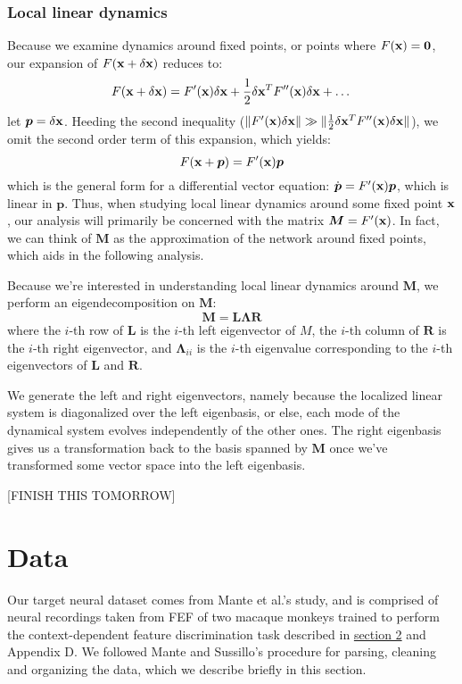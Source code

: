 \documentclass[12pt,a4paper,final]{iopart}
\begin{document}
\subsubsection{Local linear dynamics}
Because we examine dynamics around fixed points, or points where $F({\bf x}) = {\bf 0}$, our expansion of $F({\bf x} + \delta {\bf x})$ reduces to:
\[
    F({\bf x} + \delta {\bf x}) = F'({\bf x})\delta {\bf x} + \frac{1}{2} \delta {\bf x}^T F''({\bf x}) \delta {\bf x} + \dots
\]
let $\boldsymbol{p} = \delta {\bf x}$. Heeding the second inequality ($\lVert F'({\bf x})\delta {\bf x} \rVert \gg \lVert \frac{1}{2} \delta {\bf x}^T F''({\bf x}) \delta {\bf x} \rVert$), we omit the second order term of this expansion, which yields:
\[
    F({\bf x} + \boldsymbol{p}) = F'({\bf x})\boldsymbol{p} 
\]
which is the general form for a differential vector equation: $\dot{\boldsymbol{p}} = F'({\bf x})\boldsymbol{p}$, which is linear in $\boldsymbol{p}$. Thus, when studying local linear dynamics around some fixed point ${\bf x}$, our analysis will primarily be concerned with the matrix $\boldsymbol{M} = F'({\bf x})$. In fact, we can think of $\boldsymbol{M}$ as the approximation of the network around fixed points, which aids in the following analysis.

Because we're interested in understanding local linear dynamics around $\boldsymbol{M}$, we perform an eigendecomposition on $\boldsymbol{M}$:
\[
    \boldsymbol{M} = \boldsymbol{L} \boldsymbol{\Lambda} \boldsymbol{R}
\]
where the $i$-th row of $\boldsymbol{L}$ is the $i$-th left eigenvector of $M$, the $i$-th column of $\boldsymbol{R}$ is the $i$-th right eigenvector, and $\boldsymbol{\Lambda}_{ii}$ is the $i$-th eigenvalue corresponding to the $i$-th eigenvectors of $\boldsymbol{L}$ and $\boldsymbol{R}$.

We generate the left and right eigenvectors, namely because the localized linear system is diagonalized over the left eigenbasis, or else, each mode of the dynamical system evolves independently of the other ones. The right eigenbasis gives us a transformation back to the basis spanned by $\boldsymbol{M}$ once we've transformed some vector space into the left eigenbasis. 

[FINISH THIS TOMORROW]

\section{Data}
\label{sec:data}
Our target neural dataset comes from Mante et al.'s study, and is comprised of neural recordings taken from FEF of two macaque monkeys trained to perform the context-dependent feature discrimination task described in \hyperref[sec:back]{section 2} and Appendix D. We followed Mante and Sussillo's procedure for parsing, cleaning and organizing the data, which we describe briefly in this section.
\end{document}
